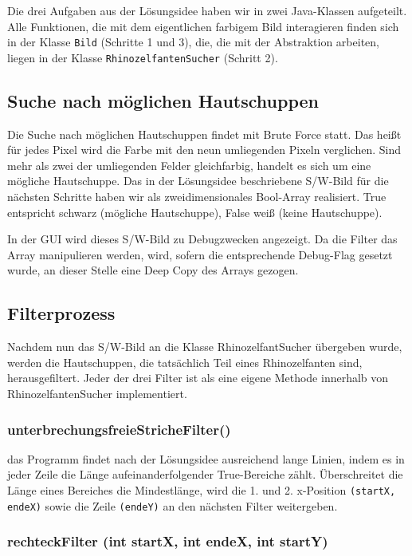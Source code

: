 Die drei Aufgaben aus der Lösungsidee haben wir in zwei Java-Klassen aufgeteilt. Alle Funktionen, die mit dem eigentlichen farbigem Bild interagieren finden sich in der Klasse \texttt{Bild} (Schritte 1 und 3), die, die mit der Abstraktion arbeiten, liegen in der Klasse \texttt{RhinozelfantenSucher} (Schritt 2).

	\subsection {Suche nach möglichen Hautschuppen}

	Die Suche nach möglichen Hautschuppen findet mit Brute Force statt. Das heißt für jedes Pixel wird die Farbe mit den neun umliegenden Pixeln verglichen. Sind mehr als zwei der umliegenden Felder gleichfarbig, handelt es sich um eine mögliche Hautschuppe. Das in der Lösungsidee beschriebene S/W-Bild für die nächsten Schritte haben wir als zweidimensionales Bool-Array realisiert. True entspricht schwarz (mögliche Hautschuppe), False weiß (keine Hautschuppe). 

	In der GUI wird dieses S/W-Bild zu Debugzwecken angezeigt. Da die Filter das Array manipulieren werden, wird, sofern die entsprechende Debug-Flag gesetzt wurde, an dieser Stelle eine Deep Copy des Arrays gezogen.

	\subsection {Filterprozess}
	Nachdem nun das S/W-Bild an die Klasse RhinozelfantSucher übergeben wurde, werden die Hautschuppen, die tatsächlich Teil eines Rhinozelfanten sind, herausgefiltert. Jeder der drei Filter ist als eine eigene Methode innerhalb von RhinozelfantenSucher implementiert.

		\subsubsection{unterbrechungsfreieStricheFilter()}

		das Programm findet nach der Lösungsidee ausreichend lange Linien, indem es in jeder Zeile die Länge aufeinanderfolgender True-Bereiche zählt. Überschreitet die Länge eines Bereiches die Mindestlänge, wird die 1. und 2. x-Position \texttt{(startX, endeX)} sowie die Zeile \texttt{(endeY)} an den nächsten Filter weitergeben.

		\subsubsection{rechteckFilter (int startX, int endeX, int startY)}

